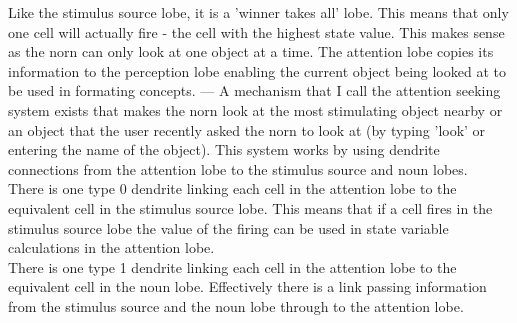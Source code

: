 \documentclass[11pt,twoside,a4paper]{article}
\begin{document}
Like the stimulus source lobe, it is a 'winner takes all' lobe. This means that only one cell will actually fire - the cell with the highest state value. This makes sense as the norn can only look at one object at a time. The attention lobe copies its information to the perception lobe enabling the current object being looked at to be used in formating concepts. --- A mechanism that I call the attention seeking system exists that makes the norn look at the most stimulating object nearby or an object that the user recently asked the norn to look at (by typing 'look' or entering the name of the object). This system works by using dendrite connections from the attention lobe to the stimulus source and noun lobes.~\\

There is one type 0 dendrite linking each cell in the attention lobe to the equivalent cell in the stimulus source lobe. This means that if a cell fires in the stimulus source lobe the value of the firing can be used in state variable calculations in the attention lobe.~\\

There is one type 1 dendrite linking each cell in the attention lobe to the equivalent cell in the noun lobe. Effectively there is a link passing information from the stimulus source and the noun lobe through to the attention lobe.


\end{document}
